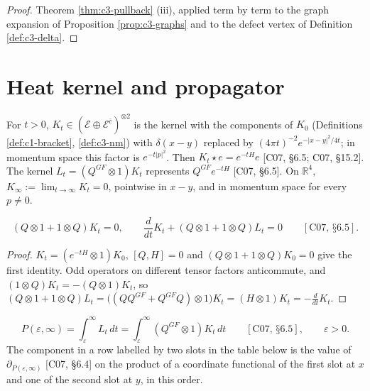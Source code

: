 \begin{proof}
Theorem \ref{thm:c3-pullback} (iii), applied term by term to the graph expansion of Proposition \ref{prop:c3-graphs} and to the defect vertex of Definition \ref{def:c3-delta}.
\end{proof}

\section{Heat kernel and propagator}

\begin{definition}
\label{def:c3-K}
For $t>0$, $K_t\in(\mathscr E\oplus\mathscr E^{\bar c})^{\otimes2}$ is the kernel with the components of $K_0$ (Definitions \ref{def:c1-bracket}, \ref{def:c3-nm}) with $\delta(x-y)$ replaced by $(4\pi t)^{-2}e^{-|x-y|^2/4t}$; in momentum space this factor is $e^{-t|p|^2}$. Then $K_t\star e=e^{-tH}e$ [C07, §6.5; C07, §15.2]. The kernel $L_t=(Q^{GF}\otimes1)K_t$ represents $Q^{GF}e^{-tH}$ [C07, §6.5]. On $\mathbb R^4$, $K_\infty:=\lim_{t\to\infty}K_t=0$, pointwise in $x-y$, and in momentum space for every $p\neq0$.
\end{definition}

\begin{proposition}
\label{prop:c3-heat}
\[
(Q\otimes1+1\otimes Q)K_t=0,\qquad \frac{d}{dt}K_t+(Q\otimes1+1\otimes Q)L_t=0\qquad[\text{C07, §6.5}].
\]
\end{proposition}

\begin{proof}
$K_t=(e^{-tH}\otimes1)K_0$, $[Q,H]=0$ and $(Q\otimes1+1\otimes Q)K_0=0$ give the first identity. Odd operators on different tensor factors anticommute, and $(1\otimes Q)K_t=-(Q\otimes1)K_t$, so $(Q\otimes1+1\otimes Q)L_t=\big((QQ^{GF}+Q^{GF}Q)\otimes1\big)K_t=(H\otimes1)K_t=-\frac{d}{dt}K_t$.
\end{proof}

\begin{definition}[Propagator]
\label{def:c3-P}
\[
P(\varepsilon,\infty)=\int_\varepsilon^\infty L_t\,dt=\int_\varepsilon^\infty(Q^{GF}\otimes1)K_t\,dt\qquad[\text{C07, §6.5}],\qquad \varepsilon>0 .
\]
The component in a row labelled by two slots in the table below is the value of $\partial_{P(\varepsilon,\infty)}$ [C07, §6.4] on the product of a coordinate functional of the first slot at $x$ and one of the second slot at $y$, in this order.
\end{definition}

